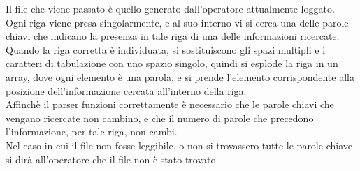 Il file che viene passato è quello generato dall'operatore attualmente loggato. Ogni riga viene presa singolarmente, e al suo interno vi si cerca una delle parole chiavi che indicano la presenza in tale riga di una delle informazioni ricercate. \\

Quando la riga corretta è individuata, si sostituiscono gli spazi multipli e i caratteri di tabulazione con uno spazio singolo, quindi si esplode la riga in un array, dove ogni elemento è una parola, e si prende l'elemento corrispondente alla posizione dell'informazione cercata all'interno della riga. \\ 

Affinchè il parser funzioni correttamente è necessario che le parole chiavi che vengano ricercate non cambino, e che il numero di parole che precedono l'informazione, per tale riga, non cambi. \\

Nel caso in cui il file non fosse leggibile, o non si trovassero tutte le parole chiave si dirà all'operatore che il file non è stato trovato. \\


